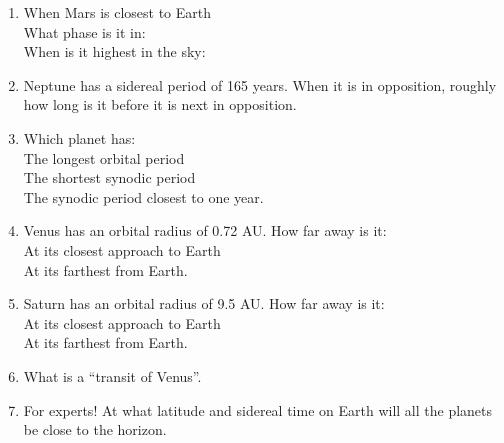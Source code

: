\begin{enumerate}
\item
When Mars is closest to Earth \\
What phase is it in: \\
When is it highest in the sky:

\item
Neptune has a sidereal period of 165 years. When it is in opposition,
roughly how long is it before it is next in opposition.


\item
Which planet has: \\
The longest orbital period\\
The shortest synodic period \\
The synodic period closest to one year.

\item
Venus has an orbital radius of 0.72 AU. How far away is it:\\
At its closest approach to Earth \\
At its farthest from Earth.

\item
Saturn has an orbital radius of 9.5 AU. How far away is it:\\
At its closest approach to Earth \\
At its farthest from Earth.

\item
What is a ``transit of Venus''.

\item 
For experts! At what latitude and sidereal time on
Earth will all the planets be close to the horizon.


\end{enumerate} 














